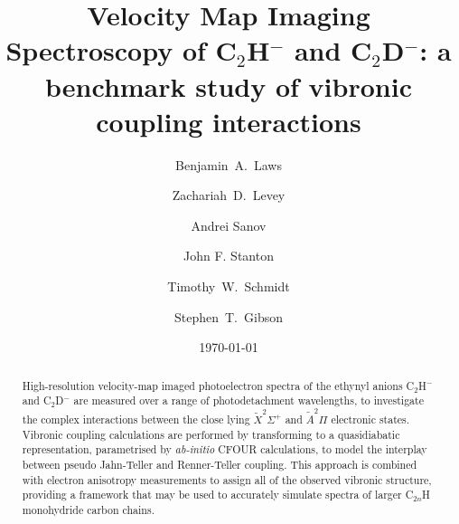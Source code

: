\documentclass[aip,graphicx]{revtex4-1}
\begin{document}

\title{Velocity Map Imaging Spectroscopy of C$_2$H$^-$ and C$_2$D$^-$: a benchmark study of vibronic coupling interactions}


\author{Benjamin~A.~Laws}
\author{Zachariah~D.~Levey} 
\author{Andrei Sanov}
\author{John F. Stanton}
\author{Timothy~W.~Schmidt} 
\author{Stephen~T.~Gibson}




\date{\today}

\begin{abstract}
High-resolution velocity-map imaged photoelectron spectra of the ethynyl anions C$_2$H$^-$ and C$_2$D$^-$ are measured over a range of photodetachment wavelengths, to investigate the complex interactions between the close lying $\tilde{X}^2\Sigma^+$ and $\tilde{A}^2\Pi$ electronic states. Vibronic coupling calculations are performed by transforming to a quasidiabatic representation, parametrised by \emph{ab-initio} CFOUR calculations, to model the interplay between pseudo Jahn-Teller and Renner-Teller coupling. This approach is combined with electron anisotropy measurements to assign all of the observed vibronic structure, providing a framework that may be used to accurately simulate spectra of larger C$_{2n}$H monohydride carbon chains.
\end{abstract}

\pacs{}

\maketitle 
\end{document}
